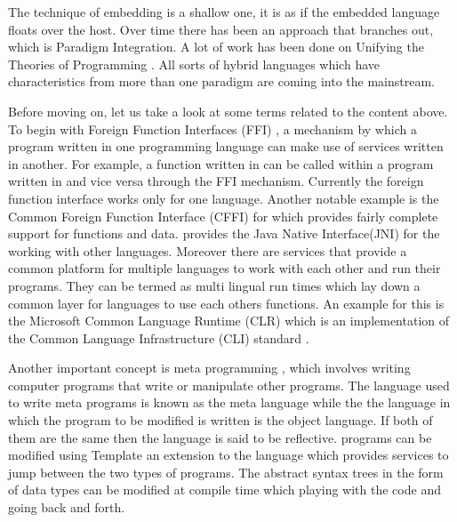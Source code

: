 \documentclass[proposal.tex]{subfiles}
\begin{document}
\par The technique of embedding is a shallow one, it is as if the embedded language floats over the host. Over time 
there has been an approach that branches out, which is Paradigm Integration. A lot of work has been done on 
Unifying the Theories of Programming 
\cite{DBLP:conf/utp/2006,DBLP:conf/utp/2008,DBLP:conf/utp/2010,DBLP:conf/utp/2012,hoare1998unifying,
gibbons2013unifying}. All sorts of hybrid languages which have characteristics from more than one paradigm are 
coming into the mainstream.

\par Before moving on, let us take a look at some terms related to the content above. To begin with Foreign 
Function Interfaces (FFI) \cite{website:ffiwiki}, a mechanism by which a program written in one programming 
language can make use of services written in another. For example, a function written in  can be 
called within a program written in  and vice versa through the FFI mechanism. Currently the 
 foreign function interface works only for one language. Another notable example is the 
Common Foreign Function Interface (CFFI) \cite{website:commonlisp} for  which provides fairly 
complete support for  functions and data.  provides the Java Native Interface(JNI) for 
the working with other languages. Moreover there are services that provide a common platform for multiple 
languages to work with each other and run their programs. They can be termed as multi lingual run times which lay 
down a common layer for languages to use each others functions. An example for this is the Microsoft Common 
Language Runtime (CLR) \cite{website:clrwiki} which is an implementation of the Common Language 
Infrastructure (CLI) standard \cite{website:cliwiki}.        

\par Another important concept is meta programming \cite{website:metaprogwiki}, which involves writing computer programs that write or manipulate 
other programs. The language used to write meta programs is known as the meta language while the the language in which the program to be modified is 
written is the object language. If both of them are the same then the language is said to be reflective.  programs can be modified using 
Template  \cite{website:templatehaskell} an extension to the language which provides services to jump between the two types of 
programs. The abstract syntax trees in the form of  data types can be modified at compile time which playing with the code and going 
back and forth.      
\end{document}
